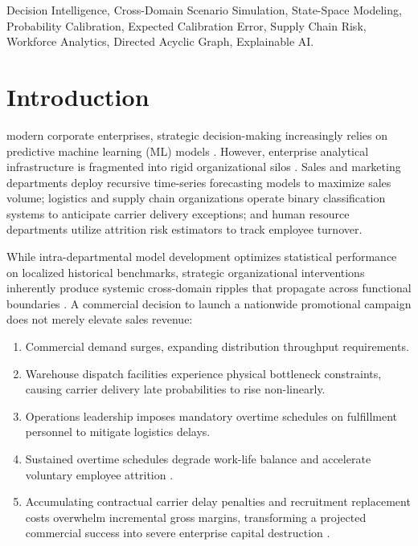 \documentclass[journal]{IEEEtran}
\begin{document}
\begin{IEEEkeywords}
Decision Intelligence, Cross-Domain Scenario Simulation, State-Space Modeling, Probability Calibration, Expected Calibration Error, Supply Chain Risk, Workforce Analytics, Directed Acyclic Graph, Explainable AI.
\end{IEEEkeywords}

\IEEEpeerreviewmaketitle

\section{Introduction}

 modern corporate enterprises, strategic decision-making increasingly relies on predictive machine learning (ML) models \cite{pratt2021decision}. However, enterprise analytical infrastructure is fragmented into rigid organizational silos \cite{sterman2000business}. Sales and marketing departments deploy recursive time-series forecasting models to maximize sales volume; logistics and supply chain organizations operate binary classification systems to anticipate carrier delivery exceptions; and human resource departments utilize attrition risk estimators to track employee turnover.

While intra-departmental model development optimizes statistical performance on localized historical benchmarks, strategic organizational interventions inherently produce systemic cross-domain ripples that propagate across functional boundaries \cite{lee1997bullwhip}. A commercial decision to launch a nationwide promotional campaign does not merely elevate sales revenue:
\begin{enumerate}
    \item Commercial demand surges, expanding distribution throughput requirements.
    \item Warehouse dispatch facilities experience physical bottleneck constraints, causing carrier delivery late probabilities to rise non-linearly.
    \item Operations leadership imposes mandatory overtime schedules on fulfillment personnel to mitigate logistics delays.
    \item Sustained overtime schedules degrade work-life balance and accelerate voluntary employee attrition \cite{maslach2001burnout}.
    \item Accumulating contractual carrier delay penalties and recruitment replacement costs overwhelm incremental gross margins, transforming a projected commercial success into severe enterprise capital destruction \cite{kaplan1996balanced}.
\end{enumerate}
\end{document}
